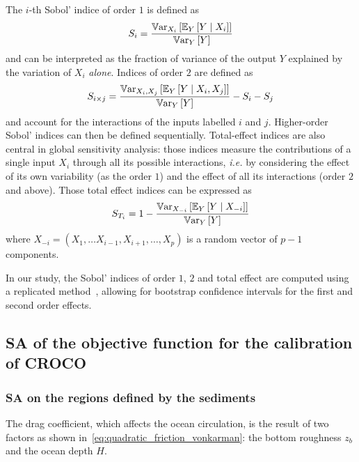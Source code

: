 \documentclass[../../Main_ManuscritThese.tex]{subfiles}
\newcommand{\zob}{z_b}
\begin{document}
The $i$-th Sobol' indice of order $1$ is defined
as~\citep{sobol_sensitivity_1993,sobol_global_2001}
\begin{equation}
  S_i = \frac{\mathbb{V}\mathrm{ar}_{X_i}\left[\mathbb{E}_{Y}\left[Y \mid X_i\right]\right]}{\mathbb{V}\mathrm{ar}_{Y}\left[Y\right]}
\end{equation}
and can be interpreted as the fraction of variance of the output
$Y$ explained by the variation of $X_i$ \emph{alone}. Indices of
order $2$ are defined as
\begin{equation}
  S_{i\times j} = \frac{\mathbb{V}\mathrm{ar}_{X_i, X_j}\left[\mathbb{E}_{Y}\left[Y \mid X_i, X_j\right]\right]}{\mathbb{V}\mathrm{ar}_{Y}\left[Y\right]} - S_i -S_j
\end{equation}
and account for the interactions of the inputs labelled $i$ and $j$.
Higher-order Sobol' indices can then be defined
sequentially. Total-effect indices are also central in global
sensitivity analysis: those indices measure the contributions of a
single input $X_i$ through all its possible interactions,
\textit{i.e.} by considering the effect of its own variability (as the
order $1$) and the effect of all its interactions (order $2$ and
above). Those total effect indices can be expressed as
\begin{equation}
  S_{T_i} = 1 - \frac{\mathbb{V}\mathrm{ar}_{X_{-i}}\left[\mathbb{E}_{Y}\left[Y \mid X_{-i}\right]\right]}{\mathbb{V}\mathrm{ar}_{Y}\left[Y\right]}
\end{equation}
where $X_{-i} = (X_1,\dots X_{i-1},X_{i+1},\dots,X_p)$ is a random vector of $p-1$ components.

In our study, the Sobol' indices of order $1$, $2$ and total effect
are computed using a replicated
method~\citep{gilquin_making_2019,gilquin_echantillonnages_2016},
allowing for bootstrap confidence intervals for the first and second
order effects.

\subsection{SA of the objective function for the calibration of CROCO}
\subsubsection{SA on the regions defined by the sediments}
The drag coefficient, which affects the ocean circulation, is the
result of two factors as shown
in~\cref{eq:quadratic_friction_vonkarman}: the bottom roughness
$\zob$ and the ocean depth $H$.
\end{document}
